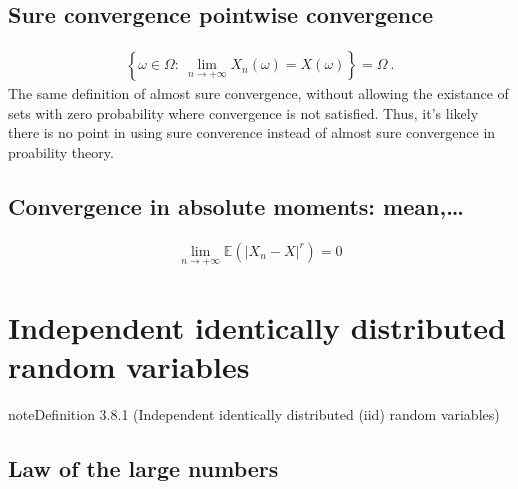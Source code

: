 \documentclass[letterpaper,10pt,english]{jupyterBook}
\begin{document}
\subsection{Sure convergence \sphinxhyphen{} pointwise convergence}
\label{\detokenize{ch/prob/convergence:sure-convergence-pointwise-convergence}}\label{\detokenize{ch/prob/convergence:prob-convergence-point}}\begin{equation*}
\begin{split}\left\{ \omega \in \Omega: \ \lim_{n \rightarrow + \infty} X_n(\omega) = X(\omega) \right\} = \Omega \ .\end{split}
\end{equation*}
\sphinxAtStartPar
The same definition of almost sure convergence, without allowing the existance of sets with zero probability where convergence is not satisfied. Thus, it’s likely there is no point in using sure converence instead of almost sure convergence in proability theory.


\subsection{Convergence in absolute moments: mean,…}
\label{\detokenize{ch/prob/convergence:convergence-in-absolute-moments-mean}}\label{\detokenize{ch/prob/convergence:prob-convergence-mean}}\begin{equation*}
\begin{split}\lim_{n \rightarrow +\infty} \mathbb{E}\left( \left| X_n - X \right|^r \right) = 0\end{split}
\end{equation*}
\sphinxstepscope


\section{Independent identically distributed random variables}
\label{\detokenize{ch/prob/iid:independent-identically-distributed-random-variables}}\label{\detokenize{ch/prob/iid:prob-iid}}\label{\detokenize{ch/prob/iid::doc}}\label{ch/prob/iid:definition-0}
\begin{sphinxadmonition}{note}{Definition 3.8.1 (Independent identically distributed (iid) random variables)}


\end{sphinxadmonition}


\subsection{Law of the large numbers}
\label{\detokenize{ch/prob/iid:law-of-the-large-numbers}}\label{\detokenize{ch/prob/iid:prob-iid-large-numbers}}
\end{document}
